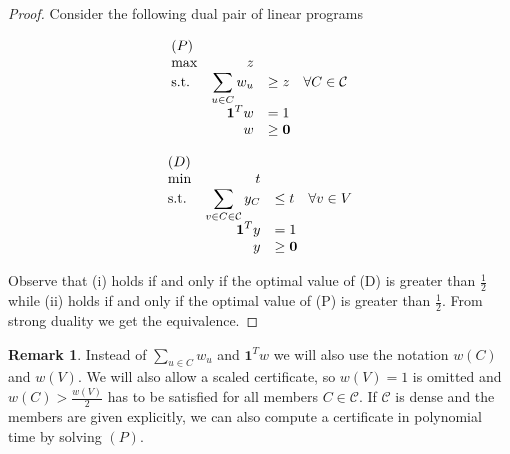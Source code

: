 \documentclass[a4paper, 12pt]{scrbook}
\theoremstyle{definition}
\newtheorem*{remark}{Remark}
\begin{document}
\begin{proof}
    Consider the following dual pair of linear programs
    \newline
    \newline
    \begin{minipage}{.5\linewidth}
        \begin{equation*}
            \begin{array}{l@{\quad} r l l}
                (P)\\
                \max          &z   \\
                \mathrm{s.t.}  &\displaystyle\sum\limits_{u\in C} w_u &\geq  z \quad \forall C \in \mathcal{C} \\
                    & \textbf{1}^Tw &=   1 \\
                    &   w &\geq   \textbf{0}
            \end{array}
        \end{equation*}
    \end{minipage}
    \begin{minipage}{.5\linewidth}
        \begin{equation*}
            \begin{array}{l@{\quad} r l l}
                (D)\\
                \min          &t   \\
                \mathrm{s.t.}  &\displaystyle\sum\limits_{v \in C \in \mathcal{C}} y_C &\leq  t \quad \forall v \in V \\
                    & \textbf{1}^Ty &=   1 \\
                    &   y &\geq   \textbf{0}
            \end{array}
        \end{equation*}
    \end{minipage}
    \newline
    \newline
    Observe that (i) holds if and only if the optimal value of (D) is greater than $\frac 12$ while (ii) holds if and only if the optimal value of (P) is greater than $\frac 12$.
    From strong duality we get the equivalence.
\end{proof}

\begin{remark}
    Instead of $\sum_{u \in C} w_u$ and $\textbf{1}^Tw$ we will also use the notation $w(C)$ and $w(V)$. We will also allow a scaled certificate, so $w(V)=1$ is omitted and $w(C) > \frac {w(V)}{2}$ has to be satisfied for all members $C \in \mathcal{C}$. If $\mathcal{C}$ is dense and the members are given explicitly, we can also compute a certificate in polynomial time by solving $(P)$.
\end{remark}
\end{document}
